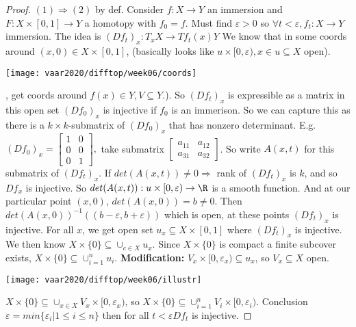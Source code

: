 \begin{proof}
  $(1) \Rightarrow (2)$ by def.
  \newline Consider $f: X \to Y$ an immersion and $F:X \times [0,1] \to Y$ a homotopy with $f_0 = f$. Must find $\varepsilon>0 $ so $\forall t < \varepsilon , f_t : X\to Y$ immersion.
  \newline The idea is $(Df_t)_x: T_xX \to Tf_t(x)Y$
  \newline We know that in some coords around $(x,0) \in X \times [0,1]$, (basically looks like $u \times [0, \varepsilon), x \in u\subseteq X$ open).
  \begin{center}
    \texttt{[image: vaar2020/difftop/week06/coords]}
  \end{center}
  , get coords around $f(x)\in Y, V\subseteq Y.$).
  \newline So $(Df_t)_x$ is expressible as a matrix in this open set $(Df_0)_x$ is injective if $f_0$ is an immerison. So we can capture this as there is a $k \times k$-submatrix of $(Df_0)_x$ that has nonzero determinant.
    \newline E.g. $(Df_0)_x = \begin{bmatrix}
      1 & 0 \\
      0 & 0 \\
      0 & 1
    \end{bmatrix},$ take submatrix $\begin{bmatrix}
      a_{11} & a_{12} \\
      a_{31} & a_{32}
    \end{bmatrix}$.
    \newline So write $A(x,t)$ for this submatrix of $(Df_t)_x$. If $det (A(x,t)) \neq 0 \Rightarrow $ rank of $(Df_t)_x$ is $k$, and so $Df_x$ is injective.
      \newline  So $det(A(x,t)): u \times [0, \varepsilon ) \to \R$ is a smooth function. And at our particular point $(x,0)$, $det(A(x,0))=b \neq 0$. Then $det(A(x,0)) ^{-1} \left((b-\varepsilon, b+ \varepsilon)\right)$ which is open, at these points $(Df_t)_x$ is injective. For all $x$, we get open set $u_x \subseteq X \times [0,1] $ where $(Df_t)_x$ is injective. We then know $X \times \{0\} \subseteq \cup_{c\in X}u_x$.
     Since $X \times \{0\}$ is compact a finite subcover exists, $X \times \{0\} \subseteq \cup_{i=1}^{n}u_i$.
     \newline \textbf{Modification:}
     $V_x \times [0, \varepsilon_x) \subseteq u_x$, so $V_x \subseteq X$ open.
        \begin{center}
          \texttt{[image: vaar2020/difftop/week06/illustr]}
        \end{center}
      $X\times \{0\} \subseteq \cup_{x\in X} V_x \times [0, \varepsilon_x)$, so $X \times \{0\} \subseteq \cup_{i=1}^n V_i \times[0, \varepsilon_i)$. Conclusion $ \varepsilon = min\{\varepsilon_i | 1 \leq i \leq n \}$ then for all $t<\varepsilon Df_t$ is injective. \qedhere
\end{proof}



